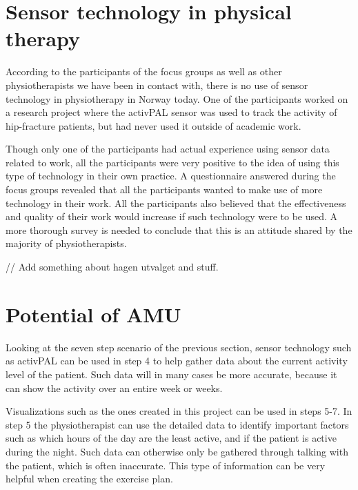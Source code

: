 \section{Sensor technology in physical therapy}
According to the participants of the focus groups as well as other physiotherapists we have been in contact with, there is no use of sensor technology in physiotherapy in Norway today. One of the participants worked on a research project where the activPAL sensor was used to track the activity of hip-fracture patients, but had never used it outside of academic work.

Though only one of the participants had actual experience using sensor data related to work, all the participants were very positive to the idea of using this type of technology in their own practice. A questionnaire answered during the focus groups revealed that all the participants wanted to make use of more technology in their work. All the participants also believed that the effectiveness and quality of their work would increase if such technology were to be used. A more thorough survey is needed to conclude that this is an attitude shared by the majority of physiotherapists.

// Add something about hagen utvalget and stuff.


\section{Potential of AMU}
Looking at the seven step scenario of the previous section, sensor technology such as activPAL can be used in step 4 to help gather data about the current activity level of the patient. Such data will in many cases be more accurate, because it can show the activity over an entire week or weeks.

Visualizations such as the ones created in this project can be used in steps 5-7. In step 5 the physiotherapist can use the detailed data to identify important factors such as which hours of the day are the least active, and if the patient is active during the night. Such data can otherwise only be gathered through talking with the patient, which is often inaccurate. This type of information can be very helpful when creating the exercise plan.

